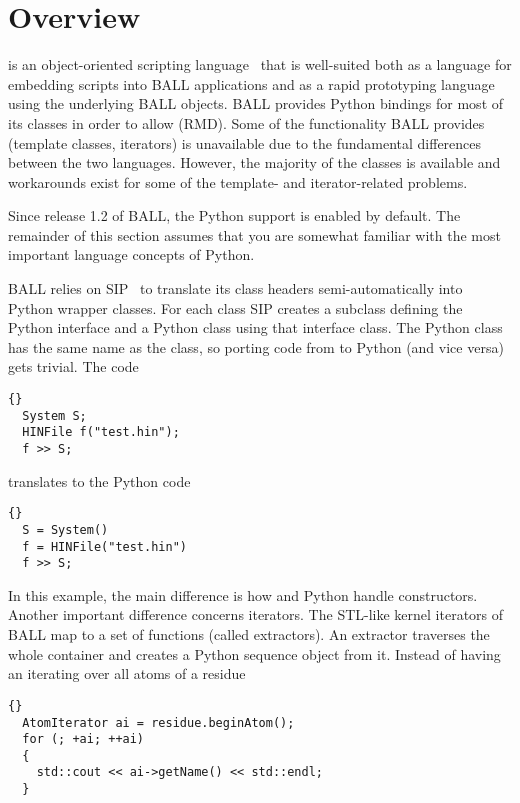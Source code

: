 \section{Overview}

 is an object-oriented scripting language~\cite{Python} that is 
well-suited both as a language for embedding scripts into BALL applications and
as a rapid prototyping language using the underlying BALL objects.
BALL provides Python bindings for most of its classes in order to allow 
 (RMD). Some of the functionality BALL 
provides (\eg template classes, iterators) is unavailable due to the 
fundamental differences between the two languages. However, the majority of 
the classes is available and workarounds exist for some of the template- and 
iterator-related problems.

Since release 1.2 of BALL, the Python support is enabled by default. The 
remainder of this section assumes that you are somewhat familiar with the most
important language concepts of Python.

BALL relies on SIP~\cite{SIP}  to translate its class
headers semi-automatically into Python wrapper classes. For each \CPP class
SIP creates a subclass defining the Python interface and a Python class
using that \CPP interface class. The Python class has the same name as the
\CPP class, so porting code from \CPP to Python (and vice versa) gets trivial.
The \CPP code 

\begin{lstlisting}{}
  System S;
  HINFile f("test.hin");
  f >> S;
\end{lstlisting}

\noindent
translates to the Python code

\begin{lstlisting}{}
  S = System()
  f = HINFile("test.hin")
  f >> S;
\end{lstlisting}

\noindent
In this example, the main difference is how \CPP and Python handle
constructors. Another important difference concerns iterators. The STL-like
kernel iterators of BALL map to a set of functions (called extractors). An
extractor traverses the whole container and creates a Python sequence object
from it. Instead of having an  iterating over all atoms of
a residue

\begin{lstlisting}{}
  AtomIterator ai = residue.beginAtom();
  for (; +ai; ++ai)
  {
    std::cout << ai->getName() << std::endl;
  }
\end{lstlisting}

